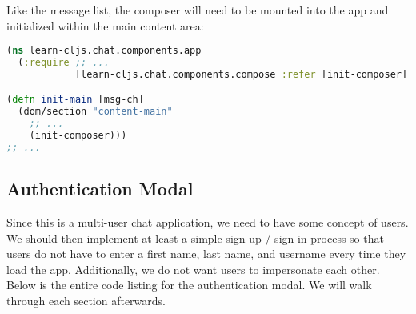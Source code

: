 \documentclass[10pt,twoside,openright]{memoir}
\begin{document}
Like the message list, the composer will need to be mounted into the app
and initialized within the main content area:

\begin{lstlisting}[language=Clojure]
(ns learn-cljs.chat.components.app
  (:require ;; ...
            [learn-cljs.chat.components.compose :refer [init-composer]]))

(defn init-main [msg-ch]
  (dom/section "content-main"
    ;; ...
    (init-composer)))
;; ...
\end{lstlisting}


\subsection{Authentication Modal}

Since this is a multi-user chat application, we need to have some
concept of users. We should then implement at least a simple sign up /
sign in process so that users do not have to enter a first name, last
name, and username every time they load the app. Additionally, we do not
want users to impersonate each other. Below is the entire code listing
for the authentication modal. We will walk through each section
afterwards.
\end{document}
